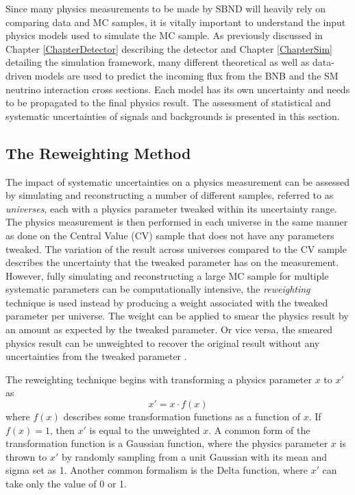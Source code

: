 Since many physics measurements to be made by SBND will heavily rely on comparing data and MC samples, it is vitally important to understand the input physics models used to simulate the MC sample.
As previously discussed in Chapter \ref{ChapterDetector} describing the detector and Chapter \ref{ChapterSim} detailing the simulation framework, many different theoretical as well as data-driven models are used to predict the incoming flux from the BNB and the SM neutrino interaction cross sections.
Each model has its own uncertainty and needs to be propagated to the final physics result.
The assessment of statistical and systematic uncertainties of signals and backgrounds is presented in this section.

\subsection{The Reweighting Method}
\label{sec:reweighting}

The impact of systematic uncertainties on a physics measurement can be assessed by simulating and reconstructing a number of different samples, referred to as \textit{universes}, each with a physics parameter tweaked within its uncertainty range.
The physics measurement is then performed in each universe in the same manner as done on the Central Value (CV) sample that does not have any parameters tweaked.
The variation of the result across universes compared to the CV sample describes the uncertainty that the tweaked parameter has on the measurement.
However, fully simulating and reconstructing a large MC sample for multiple systematic parameters can be computationally intensive, the \textit{reweighting} technique is used instead by producing a weight associated with the tweaked parameter per universe.
The weight can be applied to smear the physics result by an amount as expected by the tweaked parameter.
Or vice versa, the smeared physics result can be unweighted to recover the original result without any uncertainties from the tweaked parameter \cite{cowan_stat}.

The reweighting technique begins with transforming a physics parameter $x$ to $x'$ as 
\begin{equation}
	x' = x \cdot f(x)
\end{equation}
where $f(x)$ describes some transformation functions as a function of $x$. 
If $f(x) = 1$, then $x'$ is equal to the unweighted $x$.
A common form of the transformation function  is a Gaussian function, where the physics parameter $x$ is thrown to $x'$ by randomly sampling from a unit Gaussian with its mean and sigma set as 1.
Another common formalism is the Delta function, where $x'$ can take only the value of 0 or 1. 

